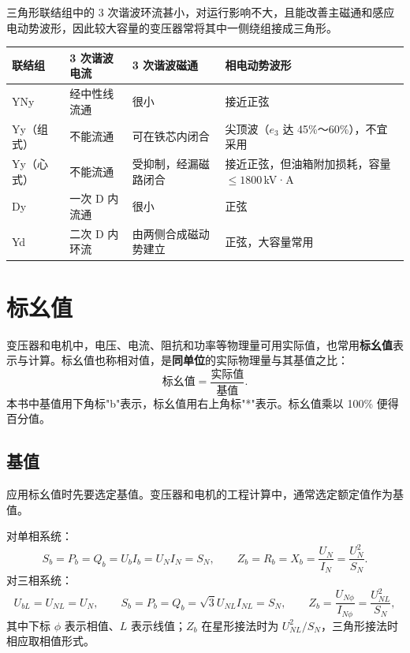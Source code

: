 三角形联结组中的 3 次谐波环流甚小，对运行影响不大，且能改善主磁通和感应电动势波形，因此较大容量的变压器常将其中一侧绕组接成三角形。

\begin{center}
\begin{tabular}{@{}p{1.5cm}p{2.5cm}p{3.4cm}p{4.2cm}@{}}
\toprule
联结组 & 3 次谐波电流 & 3 次谐波磁通 & 相电动势波形 \\
\midrule
YNy & 经中性线流通 & 很小 & 接近正弦 \\
Yy（组式） & 不能流通 & 可在铁芯内闭合 & 尖顶波（$e_3$ 达 45\%～60\%），不宜采用 \\
Yy（心式） & 不能流通 & 受抑制，经漏磁路闭合 & 接近正弦，但油箱附加损耗，容量 $\le1800$\,kV·A \\
Dy & 一次 D 内流通 & 很小 & 正弦 \\
Yd & 二次 D 内环流 & 由两侧合成磁动势建立 & 正弦，大容量常用 \\
\bottomrule
\end{tabular}
\end{center}


\section{标幺值}

变压器和电机中，电压、电流、阻抗和功率等物理量可用实际值，也常用\textbf{标幺值}表示与计算。标幺值也称相对值，是\textbf{同单位}的实际物理量与其基值之比：
\begin{equation}
\text{标幺值}=\frac{\text{实际值}}{\text{基值}} .
\end{equation}
本书中基值用下角标"b"表示，标幺值用右上角标"*"表示。标幺值乘以 100\% 便得百分值。

\subsection{基值}
应用标幺值时先要选定基值。变压器和电机的工程计算中，通常选定额定值作为基值。

对单相系统：
\begin{equation}
S_b=P_b=Q_b=U_bI_b=U_NI_N=S_N,\qquad
Z_b=R_b=X_b=\frac{U_N}{I_N}=\frac{U_N^{2}}{S_N}.
\end{equation}
对三相系统：
\begin{equation}
U_{bL}=U_{NL}=U_N,\qquad
S_b=P_b=Q_b=\sqrt3U_{NL}I_{NL}=S_N,\qquad
Z_b=\frac{U_{N\phi}}{I_{N\phi}}=\frac{U_{NL}^{2}}{S_N},
\end{equation}
其中下标 $\phi$ 表示相值、$L$ 表示线值；$Z_b$ 在星形接法时为 $U_{NL}^{2}/S_N$，三角形接法时相应取相值形式。

